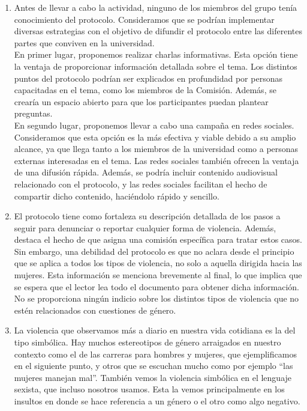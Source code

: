 \documentclass[12pt, a4paper]{article}
\begin{document}
    \begin{enumerate}

      \item Antes de llevar a cabo la actividad, ninguno de los miembros del grupo tenía conocimiento del protocolo. Consideramos que se podrían implementar diversas estrategias con el objetivo de difundir el protocolo entre las diferentes partes que conviven en la universidad.\\
        En primer lugar, proponemos realizar charlas informativas. Esta opción tiene la ventaja de proporcionar información detallada sobre el tema. Los distintos puntos del protocolo podrían ser explicados en profundidad por personas capacitadas en el tema, como los miembros de la Comisión. Además, se crearía un espacio abierto para que los participantes puedan plantear preguntas.\\
        En segundo lugar, proponemos llevar a cabo una campaña en redes sociales. Consideramos que esta opción es la más efectiva y viable debido a su amplio alcance, ya que llega tanto a los miembros de la universidad como a personas externas interesadas en el tema. Las redes sociales también ofrecen la ventaja de una difusión rápida. Además, se podría incluir contenido audiovisual relacionado con el protocolo, y las redes sociales facilitan el hecho de compartir dicho contenido, haciéndolo rápido y sencillo.\\

      \item El protocolo tiene como fortaleza su descripción detallada de los pasos a seguir para denunciar o reportar cualquier forma de violencia. Además, destaca el hecho de que asigna una comisión específica para tratar estos casos.\\
        Sin embargo, una debilidad del protocolo es que no aclara desde el principio que se aplica a todos los tipos de violencia, no solo a aquella dirigida hacia las mujeres. Esta información se menciona brevemente al final, lo que implica que se espera que el lector lea todo el documento para obtener dicha información. No se proporciona ningún indicio sobre los distintos tipos de violencia que no estén relacionados con cuestiones de género.
 
      \item La violencia que observamos más a diario en nuestra vida cotidiana es la del tipo simbólica. Hay muchos estereotipos de género arraigados en nuestro contexto como el de las carreras para hombres y mujeres, que ejemplificamos en el siguiente punto, y otros que se escuchan mucho como por ejemplo “las mujeres manejan mal”. También vemos la violencia simbólica en el lenguaje sexista, que incluso nosotros usamos. Esta la vemos principalmente en los insultos en donde se hace referencia a un género o el otro como algo negativo.


\end{enumerate}
\end{document}
